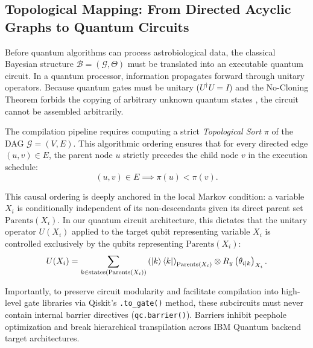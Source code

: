 \subsection{Topological Mapping: From Directed Acyclic Graphs to Quantum Circuits}
Before quantum algorithms can process astrobiological data, the classical Bayesian structure $\mathcal{B} = (\mathcal{G}, \Theta)$ must be translated into an executable quantum circuit. In a quantum processor, information propagates forward through unitary operators. Because quantum gates must be unitary ($U^\dagger U = I$) and the No-Cloning Theorem forbids the copying of arbitrary unknown quantum states \cite{nielsen2010}, the circuit cannot be assembled arbitrarily.

The compilation pipeline requires computing a strict \emph{Topological Sort} $\pi$ of the DAG $\mathcal{G} = (V, E)$. This algorithmic ordering ensures that for every directed edge $(u, v) \in E$, the parent node $u$ strictly precedes the child node $v$ in the execution schedule:
\begin{equation}
(u, v) \in E \implies \pi(u) < \pi(v).
\label{eq:topological_sort_condition}
\end{equation}

This causal ordering is deeply anchored in the local Markov condition: a variable $X_i$ is conditionally independent of its non-descendants given its direct parent set $\mathrm{Parents}(X_i)$. In our quantum circuit architecture, this dictates that the unitary operator $U(X_i)$ applied to the target qubit representing variable $X_i$ is controlled exclusively by the qubits representing $\mathrm{Parents}(X_i)$:
\begin{equation}
U(X_i) = \sum_{k \in \mathrm{states}(\mathrm{Parents}(X_i))} \left(\left|k\right\rangle\left\langle k\right|\right)_{\mathrm{Parents}(X_i)} \otimes R_y\left(\theta_{i \mid k}\right)_{X_i}.
\label{eq:topological_cpt_unitary}
\end{equation}

Importantly, to preserve circuit modularity and facilitate compilation into high-level gate libraries via Qiskit's \texttt{.to\_gate()} method, these subcircuits must never contain internal barrier directives (\texttt{qc.barrier()}). Barriers inhibit peephole optimization and break hierarchical transpilation across IBM Quantum backend target architectures.

